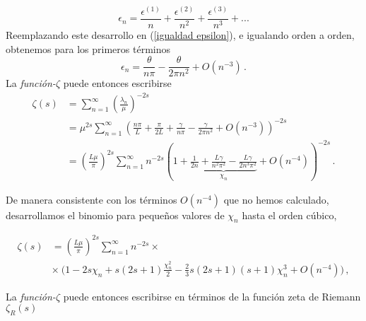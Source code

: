 \begin{equation}
    \epsilon _n = 
    \frac{\epsilon ^{(1)}}{n}  + 
    \frac{\epsilon ^{(2)}}{n ^2}  + 
    \frac{\epsilon ^{(3)}}{n ^3}  + ...
\label{eq.epsilon}
\end{equation}
Reemplazando este desarrollo en (\ref{igualdad epsilon}), e igualando orden a orden, obtenemos para los primeros términos
\begin{equation}
    \epsilon _n = \frac{\theta}{n \pi} 
     - \frac{ \theta}{2 \pi n ^2 } + O \left( n ^{-3}\right) 
     \, .
\label{epsilons}
\end{equation}
La  {\it función-$\zeta$} puede entonces escribirse
\begin{equation}
\begin{aligned}
    \zeta  (s) &=  
    \sum _{n=1} ^{\infty} 
    \left( \frac{\lambda _n }{\mu } 
    	\right) ^ {- 2s}  \\
    &=
    \mu ^{2s} \sum _{n=1} ^{\infty} 
    \left(
	\frac{n \pi}{L } + 
    \frac{\pi}{2 L } +
    \frac{\gamma}{n \pi } -
    \frac{\gamma}{2 \pi n ^2   } +
    O \left(  n^{-3} \right) 
    \right) ^{-2 s}  \\[5pt]
    &= \left( \frac{L \mu }{\pi} \right) ^{2s}    
    \sum _{n=1} ^{\infty} 
    n ^{- 2 s} 
    \left(
    1 +     
    \underbrace{
        \frac{1}{2 n} + 
        \frac{L \gamma}{n^2 \pi ^2} -
        \frac{L \gamma}{2 n ^3 \pi ^2} } 
        _{ \chi _n} +
        O \left(n ^{-4} \right)  
    \right ) ^{-2 s}
    \, .
\end{aligned}
\end{equation}

De manera consistente con los términos  $ O (n ^{-4})$ que no hemos calculado, desarrollamos el binomio para pequeños valores de $\chi _n$ hasta el orden cúbico,


\begin{align}
\zeta  (s) &= 
\left( \frac{L \mu }{\pi} \right) ^{2 s}
\sum _{n=1} ^{\infty}
  n  ^{-2 s} \times \\[5pt]
& \times   \ \Bigg(
	1 - 
	2 s \chi _n +  s(2s+1) \frac{\chi _n ^2}{2} - 
	\frac{2}{3} s(2s+1)(s+1) \chi _n ^3  + O \left( n ^{-4} \right) \Bigg)
	\, ,
	\nonumber
\end{align}

La {\it función-$\zeta$} puede entonces escribirse en términos de la función zeta de Riemann $\zeta _R (s)$


